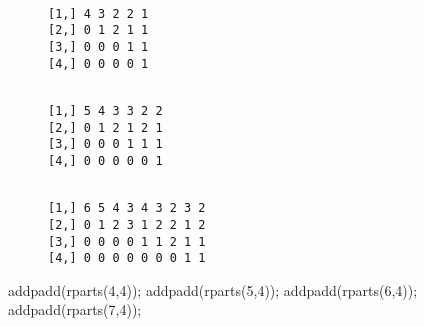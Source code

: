 \documentclass[
  letterpaper,
]{article}
\newenvironment{Shaded}{\begin{snugshade}}{\end{snugshade}}
\newcommand{\DecValTok}[1]{\textcolor[rgb]{0.68,0.00,0.00}{#1}}
\newcommand{\FunctionTok}[1]{\textcolor[rgb]{0.28,0.35,0.67}{#1}}
\newcommand{\NormalTok}[1]{\textcolor[rgb]{0.00,0.23,0.31}{#1}}
\begin{document}
\begin{figure}

\begin{minipage}{0.28\linewidth}

\begin{verbatim}
              
[1,] 4 3 2 2 1
[2,] 0 1 2 1 1
[3,] 0 0 0 1 1
[4,] 0 0 0 0 1
\end{verbatim}

\end{minipage}%
%
\begin{minipage}{0.32\linewidth}

\begin{verbatim}
                
[1,] 5 4 3 3 2 2
[2,] 0 1 2 1 2 1
[3,] 0 0 0 1 1 1
[4,] 0 0 0 0 0 1
\end{verbatim}

\end{minipage}%
%
\begin{minipage}{0.40\linewidth}

\begin{verbatim}
                      
[1,] 6 5 4 3 4 3 2 3 2
[2,] 0 1 2 3 1 2 2 1 2
[3,] 0 0 0 0 1 1 2 1 1
[4,] 0 0 0 0 0 0 0 1 1
\end{verbatim}

\end{minipage}%

\end{figure}%

\begin{Shaded}
\begin{Highlighting}[]
\FunctionTok{addpadd}\NormalTok{(}\FunctionTok{rparts}\NormalTok{(}\DecValTok{4}\NormalTok{,}\DecValTok{4}\NormalTok{));   }\FunctionTok{addpadd}\NormalTok{(}\FunctionTok{rparts}\NormalTok{(}\DecValTok{5}\NormalTok{,}\DecValTok{4}\NormalTok{)); }
\FunctionTok{addpadd}\NormalTok{(}\FunctionTok{rparts}\NormalTok{(}\DecValTok{6}\NormalTok{,}\DecValTok{4}\NormalTok{));   }\FunctionTok{addpadd}\NormalTok{(}\FunctionTok{rparts}\NormalTok{(}\DecValTok{7}\NormalTok{,}\DecValTok{4}\NormalTok{));}
\end{Highlighting}
\end{Shaded}
\end{document}
